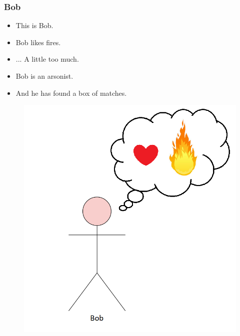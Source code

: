 \documentclass{beamer}
\theoremstyle{plain}
\theoremstyle{definition}
\begin{document}
\begin{frame}
\frametitle{Bob}
\begin{itemize}
\item This is Bob.
\item Bob likes fires.
\item ... A little too much.
\item Bob is an arsonist.
\item And he has found a box of matches.
\end{itemize}

\begin{figure}
\includegraphics[scale=0.23]{bobFire}
\end{figure}
\end{frame}
\end{document}
